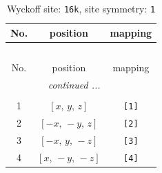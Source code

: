\documentclass[fleqn,8pt]{jsarticle}
\begin{document}
\begin{longtable}{ccc}
\caption{Wyckoff site: {\tt 16k}, site symmetry: {\tt 1}}
 \\
 \hline \hline
No. & position & mapping \\ \hline \endfirsthead

\multicolumn{2}{l}{\tablename\ \thetable{}} \\
 \hline \hline
No. & position & mapping \\ \hline \endhead

 \hline \hline
\multicolumn{2}{r}{\footnotesize\it continued ...} \\ \endfoot

 \hline \hline
\multicolumn{2}{r}{} \\ \endlastfoot

1 & $\left[ x,\, y,\, z \right]$ & {\tt [1]} \\ \hline
2 & $\left[ - x,\, - y,\, z \right]$ & {\tt [2]} \\ \hline
3 & $\left[ - x,\, y,\, - z \right]$ & {\tt [3]} \\ \hline
4 & $\left[ x,\, - y,\, - z \right]$ & {\tt [4]} \\
\end{longtable}
\end{document}
